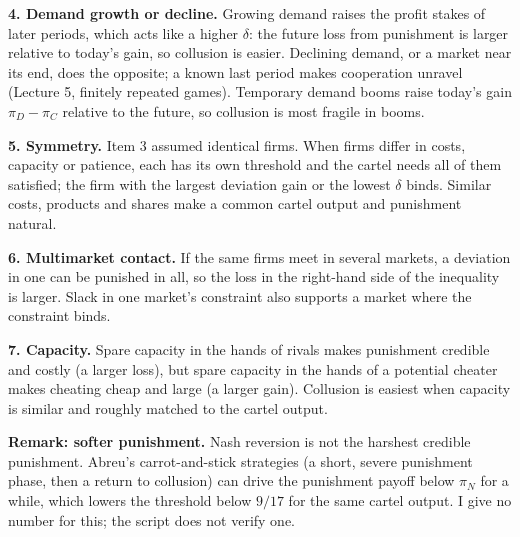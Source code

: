 \documentclass[11pt,a4paper]{article}
\begin{document}
\textbf{4. Demand growth or decline.} Growing demand raises the profit stakes of later periods, which acts
like a higher $\delta$: the future loss from punishment is larger relative to today's gain, so collusion is
easier. Declining demand, or a market near its end, does the opposite; a known last period makes
cooperation unravel (Lecture 5, finitely repeated games). Temporary demand booms raise today's
gain $\pi_D - \pi_C$ relative to the future, so collusion is most fragile in booms.

\textbf{5. Symmetry.} Item 3 assumed identical firms. When firms differ in costs, capacity or
patience, each has its own threshold and the cartel needs all of them satisfied; the firm with the largest
deviation gain or the lowest $\delta$ binds. Similar costs, products and shares make a common cartel
output and punishment natural.

\textbf{6. Multimarket contact.} If the same firms meet in several markets, a deviation in one can be
punished in all, so the loss in the right-hand side of the inequality is larger. Slack in one market's
constraint also supports a market where the constraint binds.

\textbf{7. Capacity.} Spare capacity in the hands of rivals makes punishment credible and costly (a
larger loss), but spare capacity in the hands of a potential cheater makes cheating cheap and large (a
larger gain). Collusion is easiest when capacity is similar and roughly matched to the cartel output.

\textbf{Remark: softer punishment.} Nash reversion is not the harshest credible punishment. Abreu's
carrot-and-stick strategies (a short, severe punishment phase, then a return to collusion) can drive the
punishment payoff below $\pi_N$ for a while, which lowers the threshold below $9/17$ for the same cartel
output. I give no number for this; the script does not verify one.
\end{document}
